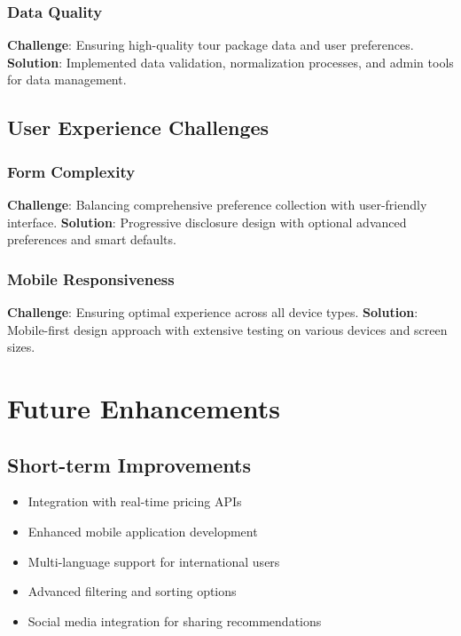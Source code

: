 \documentclass[12pt,a4paper]{article}
\begin{document}
\subsubsection{Data Quality}
\textbf{Challenge}: Ensuring high-quality tour package data and user preferences.
\textbf{Solution}: Implemented data validation, normalization processes, and admin tools for data management.

\subsection{User Experience Challenges}

\subsubsection{Form Complexity}
\textbf{Challenge}: Balancing comprehensive preference collection with user-friendly interface.
\textbf{Solution}: Progressive disclosure design with optional advanced preferences and smart defaults.

\subsubsection{Mobile Responsiveness}
\textbf{Challenge}: Ensuring optimal experience across all device types.
\textbf{Solution}: Mobile-first design approach with extensive testing on various devices and screen sizes.

\newpage

\section{Future Enhancements}

\subsection{Short-term Improvements}
\begin{itemize}
    \item Integration with real-time pricing APIs
    \item Enhanced mobile application development
    \item Multi-language support for international users
    \item Advanced filtering and sorting options
    \item Social media integration for sharing recommendations
\end{itemize}
\end{document}

